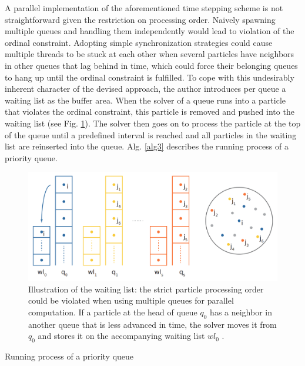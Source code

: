\documentclass[
	11pt, 
	DIV10,
	ngerman,
	a4paper, 
	oneside, 
	headings=normal, 
	captions=tableheading,
	final, 
	numbers=noenddot
]{scrartcl}
\begin{document}
A parallel implementation of the aforementioned time stepping scheme is not straightforward given the restriction on processing order. Naively spawning multiple queues and handling them independently would lead to violation of the ordinal constraint. Adopting simple synchronization strategies could cause multiple threads to be stuck at each other when several particles have neighbors in other queues that lag behind in time, which could force their belonging queues to hang up until the ordinal constraint is fulfilled. To cope with this undesirably inherent character of the devised approach, the author introduces per queue a waiting list as the buffer area. When the solver of a queue runs into a particle that violates the ordinal constraint, this particle is removed and pushed into the waiting list (see Fig. \ref{fig5}). The solver then goes on to process the particle at the top of the queue until a predefined interval is reached and all particles in the waiting list are reinserted into the queue. Alg. \ref{alg3} describes the running process of a priority queue.

\begin{figure}[tb]
	\centering
	\includegraphics[scale=0.25]{images/6}
	\caption{\label{fig5} Illustration of the waiting list: the strict particle processing order could be violated when using multiple queues for parallel computation. If a particle at the head of queue $ q_{0} $ has a neighbor in another queue that is less advanced in time, the solver moves it from $ q_{0} $ and stores it on the accompanying waiting list $ wl_{0} $ \cite{reinhardt2017fully}.}
\end{figure}

\large
\begin{algorithm}
	\DontPrintSemicolon
	\SetAlgoLined
	\SetAlCapNameFnt{\large}
	\SetAlCapFnt{\large}
	\caption{\label{alg3} Running process of a priority queue \cite{reinhardt2017fully}}
\end{algorithm}
\normalsize
\end{document}
